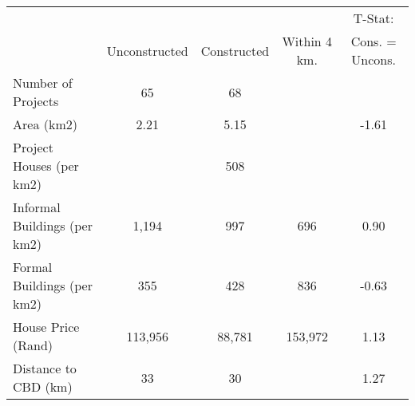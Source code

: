 \begin{tabular}{l*{1}{cccc}}
 & & & &T-Stat:  \\
 &Unconstructed &Constructed &Within 4 km. &Cons. = Uncons.  \\
\hline 
Number of Projects &         65 &         68 &  &   \\
Area (km2) &       2.21 &       5.15 &  &      -1.61  \\
Project Houses (per km2) &  &        508 &  &   \\
Informal Buildings (per km2) &      1,194 &        997 &        696 &       0.90  \\
Formal Buildings (per km2) &        355 &        428 &        836 &      -0.63  \\
House Price (Rand) &    113,956 &     88,781 &    153,972 &       1.13  \\
Distance to CBD (km) &         33 &         30 &  &       1.27  \\
\hline
\end{tabular}